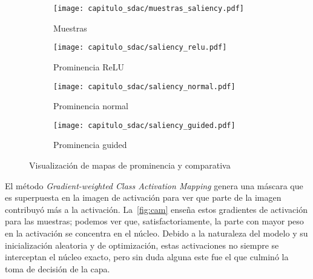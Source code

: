   \begin{figure}[H] 
    \begin{subfigure}[b]{0.5\linewidth}
      \centering
      \texttt{[image: capitulo\_sdac/muestras\_saliency.pdf]} 
      \caption{Muestras}\label{fig7:a} 
      \vspace{4ex}
    \end{subfigure}%
    \begin{subfigure}[b]{0.5\linewidth}
      \centering
      \texttt{[image: capitulo\_sdac/saliency\_relu.pdf]} 
      \caption{Prominencia ReLU}\label{fig7:b} 
      \vspace{4ex}
    \end{subfigure} 
    \begin{subfigure}[b]{0.5\linewidth}
      \centering
      \texttt{[image: capitulo\_sdac/saliency\_normal.pdf]} 
      \caption{Prominencia normal}\label{fig7:c} 
    \end{subfigure}%
    \begin{subfigure}[b]{0.5\linewidth}
      \centering
      \texttt{[image: capitulo\_sdac/saliency\_guided.pdf]} 
      \caption{Prominencia guided}\label{fig7:d} 
    \end{subfigure} 
    \caption{Visualización de mapas de prominencia y comparativa}\label{fig:saliency} 
  \end{figure}

  El método \emph{Gradient-weighted Class Activation Mapping} genera una máscara
  que es superpuesta en la imagen de activación para ver que parte de la imagen
  contribuyó más a la activación. La~\autoref{fig:cam} enseña estos gradientes
  de activación para las muestras; podemos ver que, satisfactoriamente, la parte
  con mayor peso en la activación se concentra en el núcleo. Debido a la
  naturaleza del modelo y su inicialización aleatoria y de optimización, estas
  activaciones no siempre se interceptan el núcleo exacto, pero sin duda alguna
  este fue el que culminó la toma de decisión de la capa.

